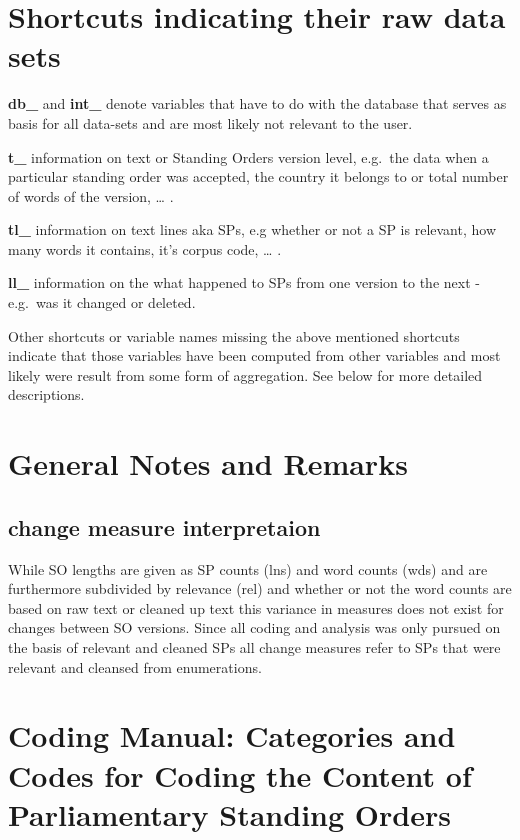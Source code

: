 \documentclass[]{article}
\begin{document}
\section{Shortcuts indicating their raw data
sets}\label{shortcuts-indicating-their-raw-data-sets}

\textbf{db\_} and \textbf{int\_} denote variables that have to do with
the database that serves as basis for all data-sets and are most likely
not relevant to the user.

\textbf{t\_} information on text or Standing Orders version level,
e.g.~the data when a particular standing order was accepted, the country
it belongs to or total number of words of the version, \ldots{} .

\textbf{tl\_} information on text lines aka SPs, e.g whether or not a SP
is relevant, how many words it contains, it's corpus code, \ldots{} .

\textbf{ll\_} information on the what happened to SPs from one version
to the next - e.g.~was it changed or deleted.

Other shortcuts or variable names missing the above mentioned shortcuts
indicate that those variables have been computed from other variables
and most likely were result from some form of aggregation. See below for
more detailed descriptions.

\section{General Notes and Remarks}\label{general-notes-and-remarks}

\subsection{change measure
interpretaion}\label{change-measure-interpretaion}

While SO lengths are given as SP counts (lns) and word counts (wds) and
are furthermore subdivided by relevance (rel) and whether or not the
word counts are based on raw text or cleaned up text this variance in
measures does not exist for changes between SO versions. Since all
coding and analysis was only pursued on the basis of relevant and
cleaned SPs all change measures refer to SPs that were relevant and
cleansed from enumerations.

\section{Coding Manual: Categories and Codes for Coding the Content of
Parliamentary Standing
Orders}\label{coding-manual-categories-and-codes-for-coding-the-content-of-parliamentary-standing-orders}
\end{document}
